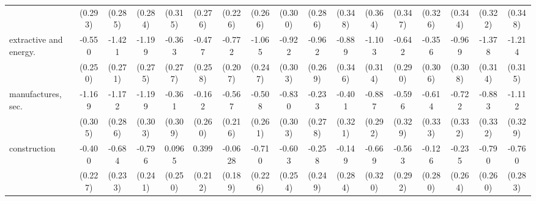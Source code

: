 {\begin{tabular}{l*{16}{c}}
                    &     (0.293)         &     (0.285)         &     (0.284)         &     (0.315)         &     (0.276)         &     (0.226)         &     (0.266)         &     (0.300)         &     (0.286)         &     (0.348)         &     (0.364)         &     (0.347)         &     (0.326)         &     (0.344)         &     (0.322)         &     (0.348)         \\
[1em]
extractive and energy.&      -0.550\sym{*}  &      -1.421\sym{***}&      -1.199\sym{***}&      -0.363         &      -0.477         &      -0.772\sym{***}&      -1.065\sym{***}&      -0.922\sym{**} &      -0.962\sym{***}&      -0.889\sym{*}  &      -1.103\sym{***}&      -0.642\sym{*}  &      -0.356         &      -0.969\sym{**} &      -1.378\sym{***}&      -1.214\sym{***}\\
                    &     (0.250)         &     (0.271)         &     (0.275)         &     (0.277)         &     (0.258)         &     (0.207)         &     (0.247)         &     (0.303)         &     (0.269)         &     (0.346)         &     (0.314)         &     (0.290)         &     (0.306)         &     (0.308)         &     (0.314)         &     (0.315)         \\
[1em]
manufactures, sec.  &      -1.169\sym{***}&      -1.172\sym{***}&      -1.199\sym{***}&      -0.361         &      -0.162         &      -0.567\sym{**} &      -0.508         &      -0.830\sym{**} &      -0.233         &      -0.401         &      -0.887\sym{**} &      -0.596         &      -0.614         &      -0.722\sym{*}  &      -0.883\sym{**} &      -1.112\sym{***}\\
                    &     (0.305)         &     (0.286)         &     (0.303)         &     (0.309)         &     (0.260)         &     (0.216)         &     (0.261)         &     (0.303)         &     (0.278)         &     (0.321)         &     (0.292)         &     (0.329)         &     (0.333)         &     (0.332)         &     (0.332)         &     (0.329)         \\
[1em]
construction        &      -0.400         &      -0.684\sym{**} &      -0.796\sym{***}&      0.0965         &       0.399         &     -0.0628         &      -0.710\sym{**} &      -0.603\sym{*}  &      -0.258         &      -0.149         &      -0.669\sym{*}  &      -0.563         &      -0.126         &      -0.235         &      -0.790\sym{**} &      -0.760\sym{**} \\
                    &     (0.227)         &     (0.233)         &     (0.241)         &     (0.250)         &     (0.212)         &     (0.189)         &     (0.226)         &     (0.254)         &     (0.249)         &     (0.284)         &     (0.320)         &     (0.292)         &     (0.280)         &     (0.264)         &     (0.260)         &     (0.283)         \\

\end{tabular}}
